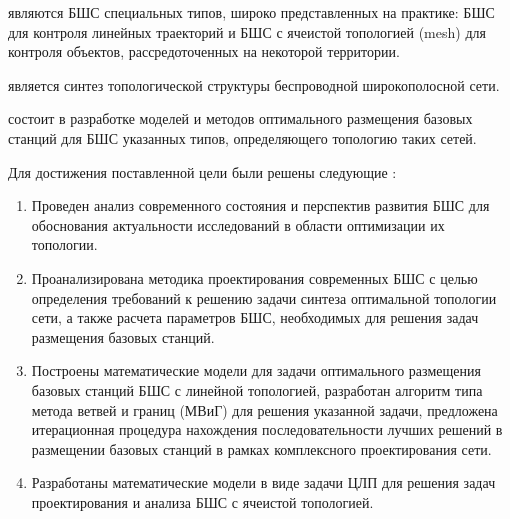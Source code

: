 {\objectresearch} являются БШС специальных типов, широко представленных на практике: БШС для контроля линейных траекторий и БШС с ячеистой топологией (mesh) для контроля объектов, рассредоточенных на некоторой территории.

{\subjectresearch} является синтез топологической структуры беспроводной широкополосной сети.

{\aim} состоит в разработке моделей и методов оптимального размещения базовых станций для БШС указанных типов, определяющего топологию таких сетей.

Для достижения поставленной цели были решены следующие {\tasks}:
\begin{enumerate}[beginpenalty=10000] %
  \item Проведен анализ современного состояния и перспектив развития БШС для  обоснования  актуальности исследований в области оптимизации их топологии. 
  \item Проанализирована методика проектирования современных БШС с целью определения требований к решению задачи синтеза оптимальной топологии сети, а также расчета параметров БШС, необходимых для решения задач размещения базовых станций.
  \item Построены математические модели для задачи оптимального размещения базовых станций БШС с линейной топологией, разработан алгоритм типа метода ветвей и границ (МВиГ) для решения указанной задачи, предложена итерационная процедура нахождения последовательности лучших решений в размещении базовых станций в рамках комплексного проектирования сети.
  \item Разработаны математические модели в виде задачи ЦЛП для решения задач проектирования и анализа БШС с ячеистой топологией.

\end{enumerate}



